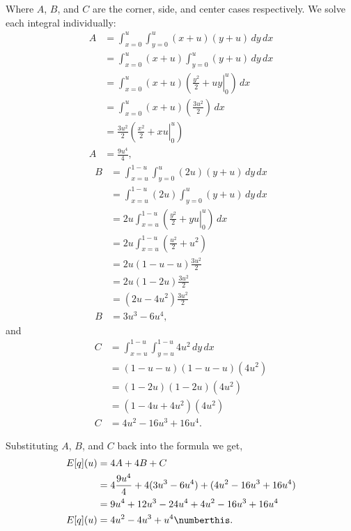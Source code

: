 Where $A$, $B$, and $C$ are the corner, side, and center cases respectively.
We solve each integral individually:
\begin{align*}
  A &= \int_{x=0}^{u} \int_{y=0}^{u} (x+u)(y+u) \, dy \, dx \\
    &= \int_{x=0}^{u} (x+u) \int_{y=0}^{u} (y+u) \, dy \, dx \\
    &= \int_{x=0}^{u} (x+u) \left(\left. \frac{y^2}{2} + uy \right|_0^u \right) \, dx \\
    &= \int_{x=0}^{u} (x+u) \left(\frac{3u^2}{2} \right) \, dx \\
    &= \frac{3u^2}{2} \left(\left. \frac{x^2}{2} + xu \right|_0^u \right) \\
  A &= \frac{9u^4}{4} 
  \text{,}
\end{align*}
\begin{align*}
  B &= \int_{x=u}^{1-u} \int_{y=0}^u (2u)(y+u) \, dy \, dx \\
    &= \int_{x=u}^{1-u} (2u) \int_{y=0}^u (y+u) \, dy \, dx \\
    &= 2u \int_{x=u}^{1-u} 
            \left(\left. \frac{y^2}{2} + yu\right|_0^u \right) \, dx \\
    &= 2u \int_{x=u}^{1-u} \left( \frac{u^2}{2}+u^2 \right) \\
    &= 2u (1-u-u) \frac{3u^2}{2} \\
    &= 2u (1-2u) \frac{3u^2}{2} \\
    &= (2u-4u^2) \frac{3u^2}{2} \\
  B &= 3u^3 - 6u^4 
  \text{,}
\end{align*}
and
\begin{align*}
  C &= \int_{x=u}^{1-u} \int_{y=u}^{1-u} 4u^2 \, dy \, dx \\
    &= (1-u-u) (1-u-u) (4u^2) \\
    &= (1-2u) (1-2u) (4u^2) \\
    &= (1-4u+4u^2) (4u^2) \\
  C &= 4u^2 - 16u^3 + 16u^4
  \text{.}
\end{align*}

Substituting $A$, $B$, and $C$ back into the formula we get,
\begin{align*}
  E[q](u) &= 4A + 4B + C \\
          &= 4 \frac{9u^4}{4} + 4 (3u^3 - 6u^4) + (4u^2 - 16u^3 + 16u^4) \\
          &= 9u^4 + 12u^3 - 24u^4 + 4u^2 - 16u^3 + 16u^4 \\
  E[q](u) &= 4u^2 - 4u^3 + u^4 \numberthis \label{eq:expfrags} \text{.}
\end{align*}

